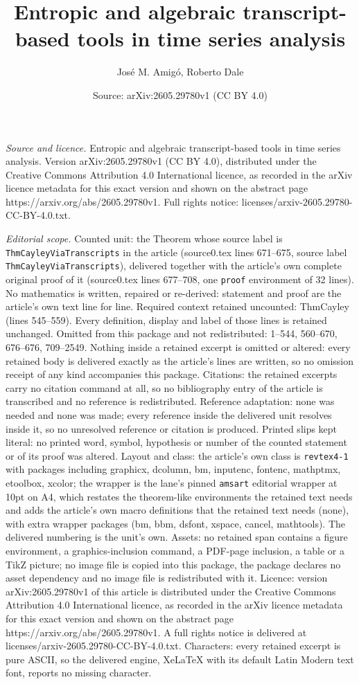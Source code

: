 \documentclass[10pt,a4paper]{amsart}
\title[Entropic and algebraic transcript-based tools in time series]{Entropic and algebraic transcript-based tools in time series analysis}
\author{Jos\'e M. Amig\'o, Roberto Dale}
\date{Source: arXiv:2605.29780v1 (CC BY 4.0)}
\begin{document}
\maketitle

\noindent\emph{Source and licence.} Entropic and algebraic transcript-based tools in time series analysis. Version arXiv:2605.29780v1 (CC BY 4.0), distributed under the Creative Commons Attribution 4.0 International licence, as recorded in the arXiv licence metadata for this exact version and shown on the abstract page https://arxiv.org/abs/2605.29780v1. Full rights notice: licenses/arxiv-2605.29780-CC-BY-4.0.txt.\par\smallskip

\noindent\textit{Editorial scope.} Counted unit: the Theorem whose source label is \texttt{ThmCayleyViaTranscripts} in the article (source0.tex lines 671--675, source label \texttt{ThmCayleyViaTranscripts}), delivered together with the article's own complete original proof of it (source0.tex lines 677--708, one \texttt{proof} environment of 32 lines). No mathematics is written, repaired or re-derived: statement and proof are the article's own text line for line. Required context retained uncounted: ThmCayley (lines 545--559). Every definition, display and label of those lines is retained unchanged. Omitted from this package and not redistributed: 1--544, 560--670, 676--676, 709--2549. Nothing inside a retained excerpt is omitted or altered: every retained body is delivered exactly as the article's lines are written, so no omission receipt of any kind accompanies this package. Citations: the retained excerpts carry no citation command at all, so no bibliography entry of the article is transcribed and no reference is redistributed. Reference adaptation: none was needed and none was made; every reference inside the delivered unit resolves inside it, so no unresolved reference or citation is produced. Printed slips kept literal: no printed word, symbol, hypothesis or number of the counted statement or of its proof was altered. Layout and class: the article's own class is \texttt{revtex4-1} with packages including graphicx, dcolumn, bm, inputenc, fontenc, mathptmx, etoolbox, xcolor; the wrapper is the lane's pinned \texttt{amsart} editorial wrapper at 10pt on A4, which restates the theorem-like environments the retained text needs and adds the article's own macro definitions that the retained text needs (none), with extra wrapper packages (bm, bbm, dsfont, xspace, cancel, mathtools). The delivered numbering is the unit's own. Assets: no retained span contains a figure environment, a graphics-inclusion command, a PDF-page inclusion, a table or a TikZ picture; no image file is copied into this package, the package declares no asset dependency and no image file is redistributed with it. Licence: version arXiv:2605.29780v1 of this article is distributed under the Creative Commons Attribution 4.0 International licence, as recorded in the arXiv licence metadata for this exact version and shown on the abstract page https://arxiv.org/abs/2605.29780v1. A full rights notice is delivered at licenses/arxiv-2605.29780-CC-BY-4.0.txt. Characters: every retained excerpt is pure ASCII, so the delivered engine, XeLaTeX with its default Latin Modern text font, reports no missing character.
\end{document}
